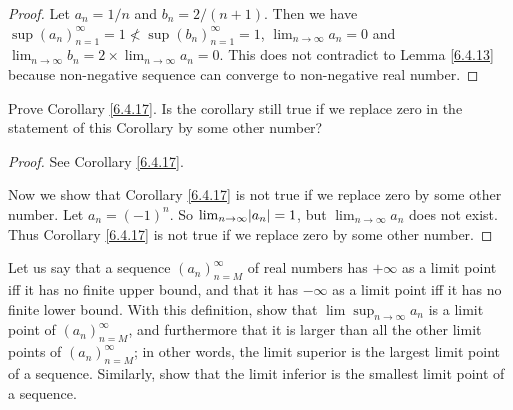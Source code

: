 \begin{proof}
Let \(a_n = 1 / n\) and \(b_n = 2 / (n + 1)\).
Then we have \(\sup(a_n)_{n = 1}^\infty = 1 \not < \sup(b_n)_{n = 1}^\infty = 1\), \(\lim_{n \to \infty} a_n = 0\) and \(\lim_{n \to \infty} b_n = 2 \times \lim_{n \to \infty} a_n = 0\).
This does not contradict to Lemma \ref{6.4.13} because non-negative sequence can converge to non-negative real number.
\end{proof}

\begin{exercise}\label{ex 6.4.7}
Prove Corollary \ref{6.4.17}.
Is the corollary still true if we replace zero in the statement of this Corollary by some other number?
\end{exercise}

\begin{proof}
See Corollary \ref{6.4.17}.

Now we show that Corollary \ref{6.4.17} is not true if we replace zero by some other number.
Let \(a_n = (-1)^n\).
So \(\lim_{n \to \infty} \abs*{a_n} = 1\), but \(\lim_{n \to \infty} a_n\) does not exist.
Thus Corollary \ref{6.4.17} is not true if we replace zero by some other number.
\end{proof}

\begin{exercise}\label{ex 6.4.8}
Let us say that a sequence \((a_n)_{n = M}^\infty\) of real numbers has \(+\infty\) as a limit point iff it has no finite upper bound, and that it has \(-\infty\) as a limit point iff it has no finite lower bound.
With this definition, show that \(\lim\sup_{n \to \infty} a_n\) is a limit point of \((a_n)_{n = M}^\infty\), and furthermore that it is larger than all the other limit points of \((a_n)_{n = M}^\infty\);
in other words, the limit superior is the largest limit point of a sequence.
Similarly, show that the limit inferior is the smallest limit point of a sequence.
\end{exercise}

